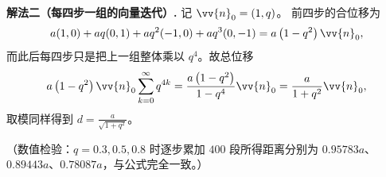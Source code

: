 \begin{enumerate}
{	\textbf{解法二（每四步一组的向量迭代）.} 记 $\vv{n}_{0}=(1,q)$。
	前四步的合位移为
	\[
	a(1,0)+aq(0,1)+aq^{2}(-1,0)+aq^{3}(0,-1)=a\left(1-q^{2}\right)\vv{n}_{0} ,
	\]
	而此后每四步只是把上一组整体乘以 $q^{4}$。故总位移
	\[
	a\left(1-q^{2}\right)\vv{n}_{0}\sum_{k=0}^{\infty}q^{4k}
	=\frac{a\left(1-q^{2}\right)}{1-q^{4}}\vv{n}_{0}=\frac{a}{1+q^{2}}\vv{n}_{0} ,
	\]
	取模同样得到 $d=\frac{a}{\sqrt{1+q^{2}}}$。

	（数值检验：$q=0.3,0.5,0.8$ 时逐步累加 $400$ 段所得距离分别为
	$0.95783a$、$0.89443a$、$0.78087a$，与公式完全一致。）
}




\end{enumerate}

